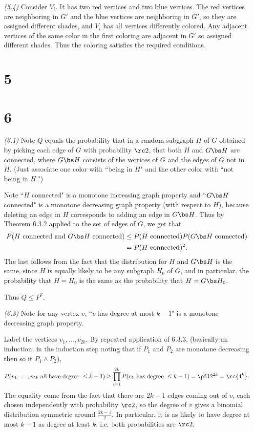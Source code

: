 \begin{problem} {\it (5.4)}
Consider $V_i$. It has two red vertices and two blue vertices. The red vertices are neighboring in $G'$ and the blue vertices are neighboring in $G'$, so they are assigned different shades, and $V_i$ has all vertices differently colored. Any adjacent vertices of the same color in the first coloring are adjacent in $G'$ so assigned different shades. Thus the coloring satisfies the required conditions.
\end{problem}

\section{5}

\section{6}
\begin{problem}{\it(6.1)}
Note $Q$ equals the probability that in a random subgraph $H$ of $G$ obtained by picking each edge of $G$ with probability $\rc2$, that both $H$ and $G\bs H$ are connected, where $G\bs H$ consists of the vertices of $G$ and the edges of $G$ not in $H$. (Just associate one color with ``being in $H$" and the  other color with ``not being in $H$.")

Note ``$H$ connected" is a monotone increasing graph property and ``$G\bs H$ connected" is a monotone decreasing graph property (with respect to $H$), because deleting an edge in $H$ corresponds to adding an edge in $G\bs H$. Thus by Theorem 6.3.2 applied to the set of edges of $G$, we get that
\begin{align*}
P(H\text{ connected  and }G\bs H\text{ connected})
&\le P(H\text{ connected})P(G\bs H\text{ connected})\\
&=P(H\text{ connected})^2.
\end{align*}
The last follows from the fact that the distribution for $H$ and $G\bs H$ is the same, since $H$ is equally likely to be any subgraph $H_0$ of $G$, and in particular, the probability that $H=H_0$ is the same as the probability that $H=G\bs H_0$.

Thus $Q\le P^2$.
\end{problem}
\begin{problem}{\it (6.3)}
Note for any vertex $v$, ``$v$ has degree at most $k-1$" is a monotone decreasing graph property. 

Label the vertices $v_1,\ldots, v_{2k}$. By repeated application of 6.3.3, (basically an induction; in the induction step noting that if $P_1$ and $P_2$ are monotone decreasing then so it $P_1\wedge P_2$),
\[
P(v_1,\ldots,v_{2k}\text{ all have degree }\le k-1)\ge
\prod_{i=1}^{2k} P(v_1\text{ has degree }\le k-1)=\pf12^{2k}=\rc{4^k}.
\]
The equality come from the fact that there are $2k-1$ edges coming out of $v$, each chosen independently with probability $\rc 2$, so the degree of $v$ gives a binomial distribution symmetric around $\frac{2k-1}{2}$. In particular, it is as likely to have degree at most $k-1$ as degree at least $k$, i.e. both probabilities are $\rc2$.
\end{problem}

